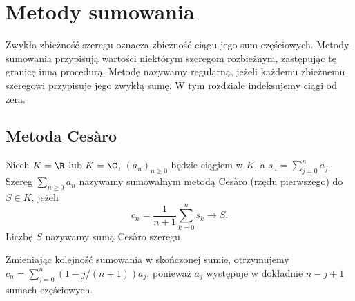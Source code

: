 \chapter{Metody sumowania}
\label{ma1:ch:summability}
Zwykła zbieżność szeregu oznacza zbieżność ciągu jego sum częściowych. Metody sumowania przypisują wartości niektórym szeregom rozbieżnym, zastępując tę granicę inną procedurą. Metodę nazywamy regularną, jeżeli każdemu zbieżnemu szeregowi przypisuje jego zwykłą sumę. W tym rozdziale indeksujemy ciągi od zera.

\section{Metoda Cesàro}
\begin{definicja}
\label{ma1:def:cesaro}
Niech $K=\R$ lub $K=\C$, $(a_n)_{n\ge0}$ będzie ciągiem w $K$, a $s_n=\sum_{j=0}^n a_j$. Szereg $\sum_{n\ge0}a_n$ nazywamy sumowalnym metodą Cesàro (rzędu pierwszego) do $S\in K$, jeżeli
\[
 c_n=\frac1{n+1}\sum_{k=0}^n s_k\longrightarrow S.
\]
Liczbę $S$ nazywamy sumą Cesàro szeregu.
\end{definicja}
Zmieniając kolejność sumowania w skończonej sumie, otrzymujemy $c_n=\sum_{j=0}^n(1-j/(n+1))a_j$, ponieważ $a_j$ występuje w dokładnie $n-j+1$ sumach częściowych.

